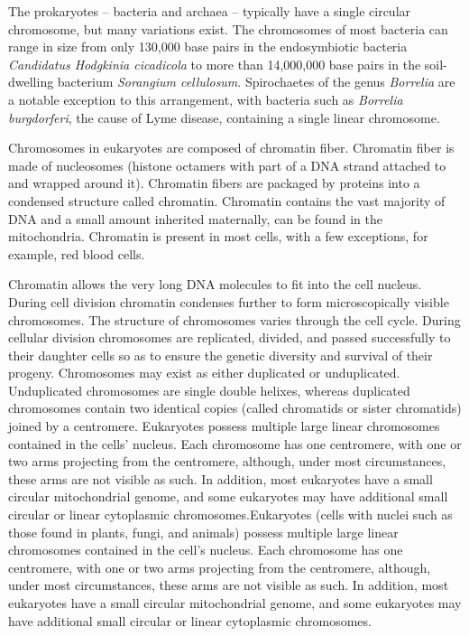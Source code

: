 \documentclass[]{book}
\theoremstyle{definition}
\theoremstyle{definition}
\theoremstyle{definition}
\theoremstyle{remark}
\begin{document}
The prokaryotes -- bacteria and archaea -- typically have a single
circular chromosome, but many variations exist. The chromosomes of most
bacteria can range in size from only 130,000 base pairs in the
endosymbiotic bacteria \emph{Candidatus Hodgkinia cicadicola} to more
than 14,000,000 base pairs in the soil-dwelling bacterium
\emph{Sorangium cellulosum}. Spirochaetes of the genus \emph{Borrelia}
are a notable exception to this arrangement, with bacteria such as
\emph{Borrelia burgdorferi}, the cause of Lyme disease, containing a
single linear chromosome.

Chromosomes in eukaryotes are composed of chromatin fiber. Chromatin
fiber is made of nucleosomes (histone octamers with part of a DNA strand
attached to and wrapped around it). Chromatin fibers are packaged by
proteins into a condensed structure called chromatin. Chromatin contains
the vast majority of DNA and a small amount inherited maternally, can be
found in the mitochondria. Chromatin is present in most cells, with a
few exceptions, for example, red blood cells.

Chromatin allows the very long DNA molecules to fit into the cell
nucleus. During cell division chromatin condenses further to form
microscopically visible chromosomes. The structure of chromosomes varies
through the cell cycle. During cellular division chromosomes are
replicated, divided, and passed successfully to their daughter cells so
as to ensure the genetic diversity and survival of their progeny.
Chromosomes may exist as either duplicated or unduplicated. Unduplicated
chromosomes are single double helixes, whereas duplicated chromosomes
contain two identical copies (called chromatids or sister chromatids)
joined by a centromere. Eukaryotes possess multiple large linear
chromosomes contained in the cells' nucleus. Each chromosome has one
centromere, with one or two arms projecting from the centromere,
although, under most circumstances, these arms are not visible as such.
In addition, most eukaryotes have a small circular mitochondrial genome,
and some eukaryotes may have additional small circular or linear
cytoplasmic chromosomes.Eukaryotes (cells with nuclei such as those
found in plants, fungi, and animals) possess multiple large linear
chromosomes contained in the cell's nucleus. Each chromosome has one
centromere, with one or two arms projecting from the centromere,
although, under most circumstances, these arms are not visible as such.
In addition, most eukaryotes have a small circular mitochondrial genome,
and some eukaryotes may have additional small circular or linear
cytoplasmic chromosomes.
\end{document}
